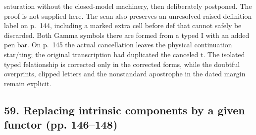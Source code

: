 \documentclass[10pt,oneside]{book}
\begin{document}
saturation without the closed-model machinery, then deliberately postponed. The proof is not supplied here. The scan also preserves an unresolved raised definition label on p.~144, including a marked extra cell before def that cannot safely be discarded. Both Gamma symbols there are formed from a typed I with an added pen bar. On p.~145 the actual cancellation leaves the physical continuation star/ting; the original transcription had duplicated the canceled t. The isolated typed felationship is corrected only in the corrected forms, while the doubtful overprints, clipped letters and the nonstandard apostrophe in the dated margin remain explicit.

\subsection*{59. Replacing intrinsic components by a given functor (pp. 146--148)}
\end{document}
